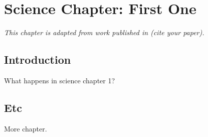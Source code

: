 \chapter{Science Chapter: First One}
\label{chapter:science1}

\begin{center}
    \textit{This chapter is adapted from work published in (cite your paper).}
\end{center}

\section{Introduction}
What happens in science chapter 1?

\section{Etc}
More chapter.